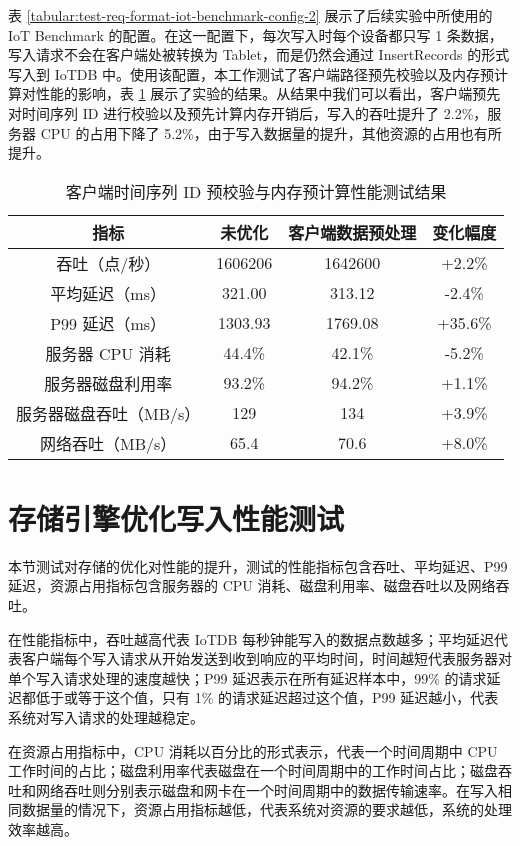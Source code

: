 表 \ref{tabular:test-req-format-iot-benchmark-config-2} 展示了后续实验中所使用的 IoT Benchmark 的配置。在这一配置下，每次写入时每个设备都只写 1 条数据，写入请求不会在客户端处被转换为 Tablet，而是仍然会通过 InsertRecords 的形式写入到 IoTDB 中。使用该配置，本工作测试了客户端路径预先校验以及内存预计算对性能的影响，表 \ref{tabular:client-offloading-performance} 展示了实验的结果。从结果中我们可以看出，客户端预先对时间序列 ID 进行校验以及预先计算内存开销后，写入的吞吐提升了 2.2\%，服务器 CPU 的占用下降了 5.2\%，由于写入数据量的提升，其他资源的占用也有所提升。

\begin{table}  
  \centering  
  \caption{客户端时间序列 ID 预校验与内存预计算性能测试结果}  
  \begin{tabular}{cccc}  
    \toprule   
    指标 & 未优化 & 客户端数据预处理 & 变化幅度 \\   
    \midrule  
    吞吐（点/秒） & 1606206 & 1642600 & +2.2\%\\  
    平均延迟（ms） & 321.00 & 313.12 & -2.4\%\\  
    P99 延迟（ms） & 1303.93 & 1769.08 & +35.6\% \\  
    服务器 CPU 消耗 & 44.4\% & 42.1\% & -5.2\%\\  
    服务器磁盘利用率 & 93.2\% & 94.2\% & +1.1\%\\  
    服务器磁盘吞吐（MB/s） & 129 & 134 & +3.9\% \\  
    网络吞吐（MB/s） & 65.4 & 70.6 & +8.0\%\\  
    \bottomrule   
  \end{tabular}  
  \label{tabular:client-offloading-performance}  
\end{table}

\section{存储引擎优化写入性能测试}
本节测试对存储的优化对性能的提升，测试的性能指标包含吞吐、平均延迟、P99 延迟，资源占用指标包含服务器的 CPU 消耗、磁盘利用率、磁盘吞吐以及网络吞吐。

在性能指标中，吞吐越高代表 IoTDB 每秒钟能写入的数据点数越多；平均延迟代表客户端每个写入请求从开始发送到收到响应的平均时间，时间越短代表服务器对单个写入请求处理的速度越快；P99 延迟表示在所有延迟样本中，99\% 的请求延迟都低于或等于这个值，只有 1\% 的请求延迟超过这个值，P99 延迟越小，代表系统对写入请求的处理越稳定。

在资源占用指标中，CPU 消耗以百分比的形式表示，代表一个时间周期中 CPU 工作时间的占比；磁盘利用率代表磁盘在一个时间周期中的工作时间占比；磁盘吞吐和网络吞吐则分别表示磁盘和网卡在一个时间周期中的数据传输速率。在写入相同数据量的情况下，资源占用指标越低，代表系统对资源的要求越低，系统的处理效率越高。

